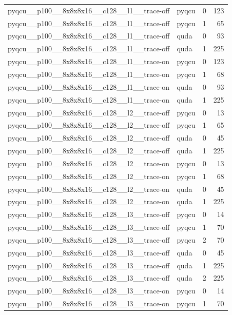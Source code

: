 \begin{table}[htbp]
\begin{tabular}{@{}llrr@{}}
pyqcu\_\_p100\_\_8x8x8x16\_\_c128\_\_l1\_\_trace-off & pyqcu & 0 & 123 \\
pyqcu\_\_p100\_\_8x8x8x16\_\_c128\_\_l1\_\_trace-off & pyqcu & 1 & 65 \\
pyqcu\_\_p100\_\_8x8x8x16\_\_c128\_\_l1\_\_trace-off & quda & 0 & 93 \\
pyqcu\_\_p100\_\_8x8x8x16\_\_c128\_\_l1\_\_trace-off & quda & 1 & 225 \\
pyqcu\_\_p100\_\_8x8x8x16\_\_c128\_\_l1\_\_trace-on & pyqcu & 0 & 123 \\
pyqcu\_\_p100\_\_8x8x8x16\_\_c128\_\_l1\_\_trace-on & pyqcu & 1 & 68 \\
pyqcu\_\_p100\_\_8x8x8x16\_\_c128\_\_l1\_\_trace-on & quda & 0 & 93 \\
pyqcu\_\_p100\_\_8x8x8x16\_\_c128\_\_l1\_\_trace-on & quda & 1 & 225 \\
pyqcu\_\_p100\_\_8x8x8x16\_\_c128\_\_l2\_\_trace-off & pyqcu & 0 & 13 \\
pyqcu\_\_p100\_\_8x8x8x16\_\_c128\_\_l2\_\_trace-off & pyqcu & 1 & 65 \\
pyqcu\_\_p100\_\_8x8x8x16\_\_c128\_\_l2\_\_trace-off & quda & 0 & 45 \\
pyqcu\_\_p100\_\_8x8x8x16\_\_c128\_\_l2\_\_trace-off & quda & 1 & 225 \\
pyqcu\_\_p100\_\_8x8x8x16\_\_c128\_\_l2\_\_trace-on & pyqcu & 0 & 13 \\
pyqcu\_\_p100\_\_8x8x8x16\_\_c128\_\_l2\_\_trace-on & pyqcu & 1 & 68 \\
pyqcu\_\_p100\_\_8x8x8x16\_\_c128\_\_l2\_\_trace-on & quda & 0 & 45 \\
pyqcu\_\_p100\_\_8x8x8x16\_\_c128\_\_l2\_\_trace-on & quda & 1 & 225 \\
pyqcu\_\_p100\_\_8x8x8x16\_\_c128\_\_l3\_\_trace-off & pyqcu & 0 & 14 \\
pyqcu\_\_p100\_\_8x8x8x16\_\_c128\_\_l3\_\_trace-off & pyqcu & 1 & 70 \\
pyqcu\_\_p100\_\_8x8x8x16\_\_c128\_\_l3\_\_trace-off & pyqcu & 2 & 70 \\
pyqcu\_\_p100\_\_8x8x8x16\_\_c128\_\_l3\_\_trace-off & quda & 0 & 45 \\
pyqcu\_\_p100\_\_8x8x8x16\_\_c128\_\_l3\_\_trace-off & quda & 1 & 225 \\
pyqcu\_\_p100\_\_8x8x8x16\_\_c128\_\_l3\_\_trace-off & quda & 2 & 225 \\
pyqcu\_\_p100\_\_8x8x8x16\_\_c128\_\_l3\_\_trace-on & pyqcu & 0 & 14 \\
pyqcu\_\_p100\_\_8x8x8x16\_\_c128\_\_l3\_\_trace-on & pyqcu & 1 & 70 \\

\end{tabular}
\end{table}
